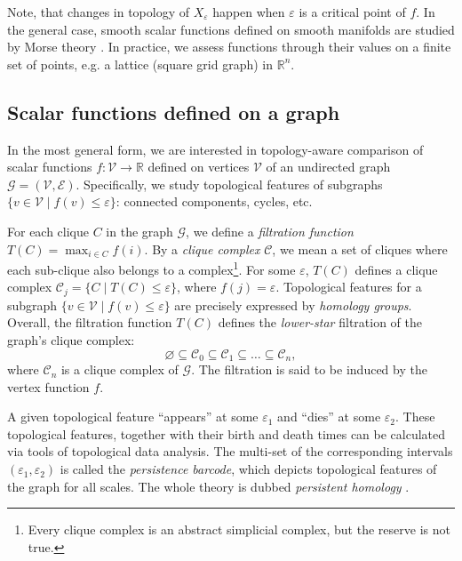 \documentclass[runningheads]{llncs}
\begin{document}
Note, that changes in topology of $X_\varepsilon$ happen when $\varepsilon$ is a critical point of $f$. In the general case, smooth scalar functions defined on smooth manifolds are studied by Morse theory \cite{barannikov2023barcodes}. 
In practice, we assess functions through their values on a finite set of points, e.g. a lattice (square grid graph) in $\mathbb{R}^n$. 


\subsection{Scalar functions defined on a graph}

In the most general form, we are interested in topology-aware comparison of scalar functions $f: \mathcal{V} \to \mathbb{R}$ defined on vertices $\mathcal{V}$ of an undirected graph $\mathcal{G} = (\mathcal{V}, \mathcal{E})$. 
Specifically, we study topological features of subgraphs \mbox{$\{v \in \mathcal{V} \; | \; f(v) \le \varepsilon\}$}: connected components, cycles, etc. 

For each clique $C$ in the graph $\mathcal{G}$, we define a \textit{filtration function}
$T(C) = \max_{i \in C} f(i)$.
By a \textit{clique complex} $\mathcal{C}$, we mean a set of cliques where each sub-clique also belongs to a complex\footnote{Every clique complex is an abstract simplicial complex, but the reserve is not true.}.
For some $\varepsilon$, $T(C)$ defines a clique complex $\mathcal{C}_{j} =\{C \; | \; T(C) \le \varepsilon\}$, where $f(j) = \varepsilon$.
Topological features for a subgraph \mbox{$\{v \in \mathcal{V} \; | \; f(v) \le \varepsilon\}$} are precisely expressed by \textit{homology groups}.
Overall, the filtration function $T(C)$ defines the \textit{lower-star} filtration of the graph's clique complex:
$$
\varnothing \subseteq \mathcal{C}_0 \subseteq \mathcal{C}_1 \subseteq \ldots \subseteq \mathcal{C}_n,
$$
where $\mathcal{C}_n$ is a clique complex of $\mathcal{G}$. The filtration is said to be induced by the vertex function $f$.



A given topological feature ``appears'' at some $\varepsilon_1$ and ``dies'' at some $\varepsilon_2$. These topological features, together with their birth and death times can be calculated via tools of topological data analysis.
The multi-set of the corresponding intervals $(\varepsilon_1, \varepsilon_2)$ is called the \textit{persistence barcode}, which depicts topological features of the graph for all scales. The whole theory is dubbed \textit{persistent homology} 
\cite{barannikov1994framed,chazal2017introduction}. 
\end{document}

